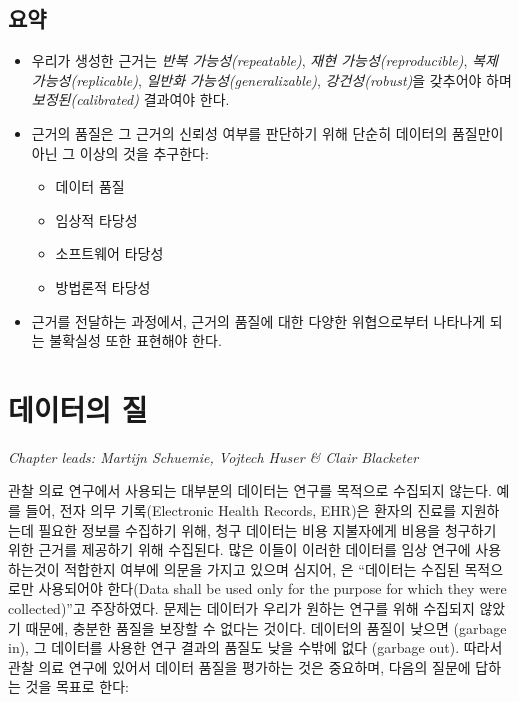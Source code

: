 \documentclass[10.5pt]{book}
\providecommand{\tightlist}{%
  \setlength{\itemsep}{0pt}\setlength{\parskip}{0pt}}
\theoremstyle{definition}
\theoremstyle{definition}
\theoremstyle{definition}
\theoremstyle{remark}
\let\BeginKnitrBlock\begin \let\EndKnitrBlock\end
\begin{document}
\section{요약}\label{-12}

\BeginKnitrBlock{rmdsummary}
\begin{itemize}
\item
  우리가 생성한 근거는 \emph{반복 가능성(repeatable)}, \emph{재현
  가능성(reproducible)}, \emph{복제 가능성(replicable)}, \emph{일반화
  가능성(generalizable)}, \emph{강건성(robust)}을 갖추어야 하며
  \emph{보정된(calibrated)} 결과여야 한다.
\item
  근거의 품질은 그 근거의 신뢰성 여부를 판단하기 위해 단순히 데이터의
  품질만이 아닌 그 이상의 것을 추구한다:

  \begin{itemize}
  \tightlist
  \item
    데이터 품질
  \item
    임상적 타당성
  \item
    소프트웨어 타당성
  \item
    방법론적 타당성
  \end{itemize}
\item
  근거를 전달하는 과정에서, 근거의 품질에 대한 다양한 위협으로부터
  나타나게 되는 불확실성 또한 표현해야 한다.
\end{itemize}
\EndKnitrBlock{rmdsummary}

\chapter{데이터의 질}\label{DataQuality}

\emph{Chapter leads: Martijn Schuemie, Vojtech Huser \& Clair Blacketer}

관찰 의료 연구에서 사용되는 대부분의 데이터는 연구를 목적으로 수집되지
않는다. 예를 들어, 전자 의무 기록(Electronic Health Records, EHR)은
환자의 진료를 지원하는데 필요한 정보를 수집하기 위해, 청구 데이터는 비용
지불자에게 비용을 청구하기 위한 근거를 제공하기 위해 수집된다. 많은
이들이 이러한 데이터를 임상 연구에 사용하는것이 적합한지 여부에 의문을
가지고 있으며 심지어, \citet{vanDerLei_1991} 은 ``데이터는 수집된
목적으로만 사용되어야 한다(Data shall be used only for the purpose for
which they were collected)''고 주장하였다. 문제는 데이터가 우리가 원하는
연구를 위해 수집되지 않았기 때문에, 충분한 품질을 보장할 수 없다는
것이다. 데이터의 품질이 낮으면 (garbage in), 그 데이터를 사용한 연구
결과의 품질도 낮을 수밖에 없다 (garbage out). 따라서 관찰 의료 연구에
있어서 데이터 품질을 평가하는 것은 중요하며, 다음의 질문에 답하는 것을
목표로 한다:
\end{document}
